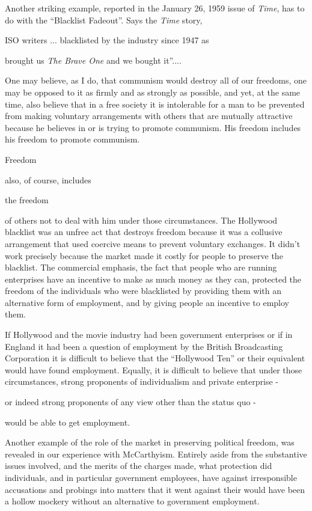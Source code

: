 \documentclass[11pt,openany]{book}
\begin{document}
Another striking example, reported in the January 26, 1959 issue of \emph{Time}, has to do with the ``Blacklist Fadeout''. Says the \emph{Time} story,

ISO writers ... blacklisted by the industry since 1947 as

brought us \emph{The Brave One} and we bought it''....

One may believe, as I do, that communism would destroy all of our freedoms, one may be opposed to it as firmly and as strongly as possible, and yet, at the same time, also believe that in a free society it is intolerable for a man to be prevented from making voluntary arrangements with others that are mutually attractive because he believes in or is trying to promote communism. His freedom includes his freedom to promote communism.

Freedom

also, of course, includes

the freedom

of others not to deal with him under those circumstances. The Hollywood blacklist was an unfree act that destroys freedom because it was a collusive arrangement that used coercive means to prevent voluntary exchanges. It didn't work precisely because the market made it costly for people to preserve the blacklist. The commercial emphasis, the fact that people who are running enterprises have an incentive to make as much money as they can, protected the freedom of the individuals who were blacklisted by providing them with an alternative form of employment, and by giving people an incentive to employ them.

If Hollywood and the movie industry had been government enterprises or if in England it had been a question of employment by the British Broadcasting Corporation it is difficult to believe that the ``Hollywood Ten'' or their equivalent would have found employment. Equally, it is difficult to believe that under those circumstances, strong proponents of individualism and private enterprise -

or indeed strong proponents of any view other than the status quo -

would be able to get employment.

Another example of the role of the market in preserving political freedom, was revealed in our experience with McCarthyism. Entirely aside from the substantive issues involved, and the merits of the charges made, what protection did individuals, and in particular government employees, have against irresponsible accusations and probings into matters that it went against their would have been a hollow mockery without an alternative to government employment.
\end{document}
